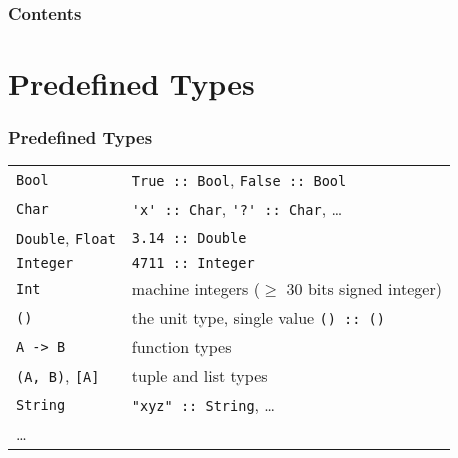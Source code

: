 \documentclass{beamer}
\subtitle{Types}
\begin{document}
\begin{frame}
  \titlepage
\end{frame}
\begin{frame}
  \frametitle{Contents}
  \tableofcontents{}
\end{frame}
\section{Predefined Types}
\begin{frame}
  \frametitle{Predefined Types}
  \begin{flushleft}
    \begin{tabular}{@{\quad$\bullet$\quad}l@{~---~}l}
      \texttt{Bool}&
                     \lstinline{True :: Bool}, \lstinline{False :: Bool} \\
      \texttt{Char} & \lstinline{'x' :: Char}, \lstinline{'?' :: Char}, \dots \\
      \texttt{Double}, \texttt{Float} & \lstinline{3.14 :: Double} \\
      \texttt{Integer} & \lstinline{4711 :: Integer} \\
      \texttt{Int} & machine integers ($\ge$ 30 bits signed integer)
      \\
      \texttt{()} & the unit type, single value \lstinline{() :: ()}
      \\
      \texttt{A -> B} & function types \\
      \texttt{(A, B)}, \texttt{[A]} & tuple and list types \\
      \texttt{String} &  \lstinline{"xyz" :: String}, \dots \\
      \dots &
    \end{tabular}
  \end{flushleft}
\end{frame}
\end{document}
